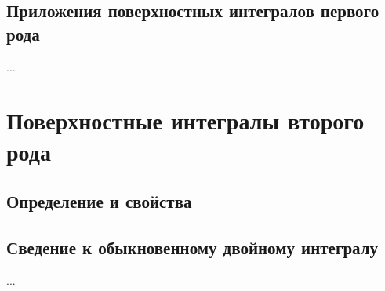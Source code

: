\subsection{Приложения поверхностных интегралов первого рода}
...

\section{Поверхностные интегралы второго рода}
\subsection{Определение и свойства}
\subsection{Сведение к обыкновенному двойному интегралу}
...


